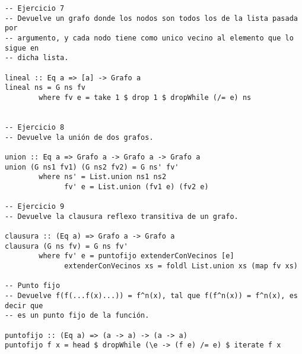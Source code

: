 \begin{verbatim}
-- Ejercicio 7
-- Devuelve un grafo donde los nodos son todos los de la lista pasada por
-- argumento, y cada nodo tiene como unico vecino al elemento que lo sigue en
-- dicha lista.

lineal :: Eq a => [a] -> Grafo a
lineal ns = G ns fv 
        where fv e = take 1 $ drop 1 $ dropWhile (/= e) ns


-- Ejercicio 8
-- Devuelve la unión de dos grafos.

union :: Eq a => Grafo a -> Grafo a -> Grafo a
union (G ns1 fv1) (G ns2 fv2) = G ns' fv'
        where ns' = List.union ns1 ns2
              fv' e = List.union (fv1 e) (fv2 e)

-- Ejercicio 9
-- Devuelve la clausura reflexo transitiva de un grafo.

clausura :: (Eq a) => Grafo a -> Grafo a
clausura (G ns fv) = G ns fv'
        where fv' e = puntofijo extenderConVecinos [e]
              extenderConVecinos xs = foldl List.union xs (map fv xs)

-- Punto fijo
-- Devuelve f(f(...f(x)...)) = f^n(x), tal que f(f^n(x)) = f^n(x), es decir que
-- es un punto fijo de la función.

puntofijo :: (Eq a) => (a -> a) -> (a -> a)
puntofijo f x = head $ dropWhile (\e -> (f e) /= e) $ iterate f x

\end{verbatim}
